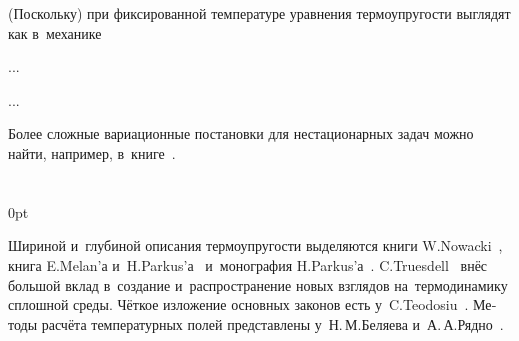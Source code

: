 

\begin{otherlanguage}{russian}

(Поскольку) при фиксированной температуре уравнения термоупругости выглядят как в~механике

...

...

Более сложные вариационные постановки для нестационарных задач можно найти, например, в~книге~\cite{belyaev.ryadno}.

\end{otherlanguage}

\section*{\small \wordforbibliography}

\begin{changemargin}{\parindent}{0pt}
\fontsize{10}{12}\selectfont

\begin{otherlanguage}{russian}

Шириной и~глубиной описания термоупругости выделяются книги \hbox{W\hspace{-0.2ex}.\:Nowacki}~\cite{nowacki-problemsofthermoelasticity, nowacki-elasticity}, книга E.\:Melan’а и~H.\:Parkus’а~\cite{parkus.melan-waermespannungen} и~моно\-графия H.\:Parkus’а~\cite{parkus-waermespannungen}.
C.\:Truesdell~\cite{truesdell-firstcourse} внёс большой вклад в~создание и~распространение новых взглядов на~термодинамику сплошной среды.
Чёткое изложение основных законов есть у~C.\:Teodosiu~\cite{teodosiu-crystaldefects}.
Методы расчёта температурных полей представлены у~Н.\,М.\;Беляева и~А.\,А.\;Рядно~\cite{belyaev.ryadno}.

\end{otherlanguage}

\end{changemargin}
